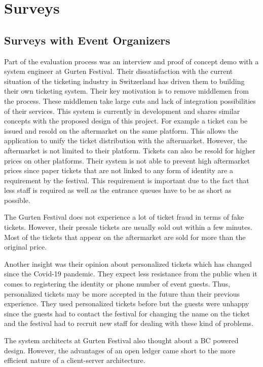 \section{Surveys}

\subsection{Surveys with Event Organizers}

Part of the evaluation process was an interview and proof of concept demo with a system engineer at Gurten Festival. Their dissatisfaction with the current situation of the ticketing industry in Switzerland has driven them to building their own ticketing system. Their key motivation is to remove middlemen from the process. These middlemen take large cuts and lack of integration possibilities of their services. This system is currently in development and shares similar concepts with the proposed design of this project. For example a ticket can be issued and resold on the aftermarket on the same platform. This allows the application to unify the ticket distribution with the aftermarket. However, the aftermarket is not limited to their platform. Tickets can also be resold for higher prices on other platforms. Their system is not able to prevent high aftermarket prices since paper tickets that are not linked to any form of identity are a requirement by the festival. This requirement is important due to the fact that less staff is required as well as the entrance queues have to be as short as possible. 

The Gurten Festival does not experience a lot of ticket fraud in terms of fake tickets. However, their presale tickets are usually sold out within a few minutes. Most of the tickets that appear on the aftermarket are sold for more than the original price.

Another insight was their opinion about personalized tickets which has changed since the Covid-19 pandemic. They expect less resistance from the public when it comes to registering the identity or phone number of event guests. Thus, personalized tickets may be more accepted in the future than their previous experience. They used personalized tickets before but the guests were unhappy since the guests had to contact the festival for changing the name on the ticket and the festival had to recruit new staff for dealing with these kind of problems. 

The system architects at Gurten Festival also thought about a BC powered design. However, the advantages of an open ledger came short to the more efficient nature of a client-server architecture.

